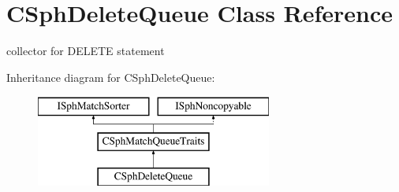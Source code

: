 \hypertarget{classCSphDeleteQueue}{\section{C\-Sph\-Delete\-Queue Class Reference}
\label{classCSphDeleteQueue}
}


collector for D\-E\-L\-E\-T\-E statement  


Inheritance diagram for C\-Sph\-Delete\-Queue\-:\begin{figure}[H]
\begin{center}
\leavevmode
\includegraphics[height=3.000000cm]{classCSphDeleteQueue}
\end{center}
\end{figure}
